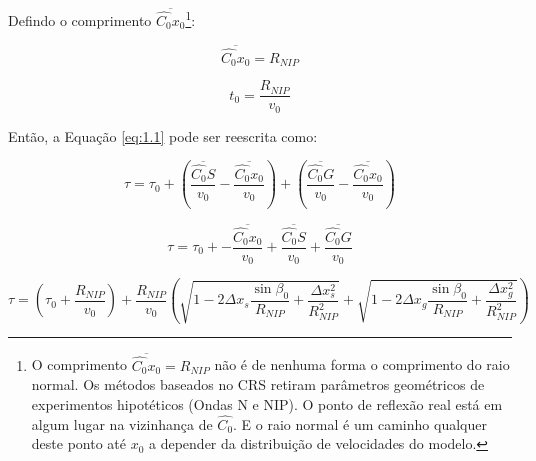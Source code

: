 \documentclass[a4paper, 12pt]{article}
\begin{document}
Defindo o comprimento $\overline{\hat{C_0}x_0}$\footnote{O comprimento
$\overline{\hat{C_0}x_0} = R_{NIP}$ não é de nenhuma forma o comprimento do raio normal.
Os métodos baseados no CRS
retiram parâmetros geométricos de experimentos hipotéticos (Ondas N e NIP).
O ponto de reflexão real está em algum lugar na vizinhança de $\hat{C_0}$.
E o raio normal é um caminho qualquer deste ponto até $x_0$ a depender da distribuição de velocidades
do modelo.}:

\begin{equation}
 \label{eq:1.20}
 \overline{\hat{C_0}x_0} = R_{NIP}
\end{equation}

\begin{equation}
 \label{eq:1.21}
t_0 = \frac{R_{NIP}}{v_0}
\end{equation}

Então, a Equação \ref{eq:1.1} pode ser reescrita como:

\begin{equation}
 \label{eq:1.22}
\tau = \tau_0 + \left( \frac{\overline{\hat{C_0}S}}{v_0} - \frac{\overline{\hat{C_0}x_0}}{v_0} \right)
+ \left( \frac{\overline{\hat{C_0}G}}{v_0} - \frac{\overline{\hat{C_0}x_0}}{v_0} \right)
\end{equation}

\begin{equation}
 \label{eq:1.23}
\tau = \tau_0 + - \frac{\overline{\hat{C_0}x_0}}{v_0} + \frac{\overline{\hat{C_0}S}}{v_0}
+ \frac{\overline{\hat{C_0}G}}{v_0}
\end{equation}

\begin{equation}
 \label{eq:1.24}
\tau = \left( \tau_0 + \frac{R_{NIP}}{v_0} \right)
+ \frac{R_{NIP}}{v_0} \left( \sqrt{  1 - 2 \Delta x_s \frac{\sin{\beta_0}}{R_{NIP}} + \frac{\Delta x_{s}^2}{R_{NIP}^2} }
+ \sqrt{  1 - 2 \Delta x_g \frac{\sin{\beta_0}}{R_{NIP}} + \frac{\Delta x_{g}^2}{R_{NIP}^2} } \right)
\end{equation}
\end{document}

